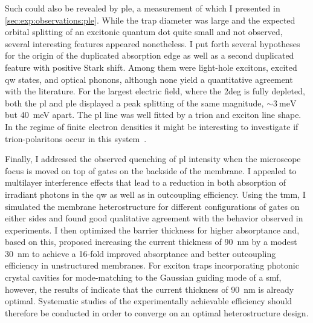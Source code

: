 Such could also be revealed by \acrfull{ple}, a measurement of which I presented in \cref{sec:exp:observations:ple}.
While the trap diameter was large and the expected orbital splitting of an excitonic quantum dot quite small and not observed, several interesting features appeared nonetheless.
I put forth several hypotheses for the origin of the duplicated absorption edge as well as a second duplicated feature with positive Stark shift.
Among them were light-hole excitons, excited \gls{qw} states, and optical phonons, although none yield a quantitative agreement with the literature.
For the largest electric field, where the \gls{2deg} is fully depleted, both the \gls{pl} and \gls{ple} displayed a peak splitting of the same magnitude, $\sim\qty{3}{\milli\electronvolt}$ but \qty{40}{\milli\electronvolt} apart.
The \gls{pl} line was well fitted by a trion and exciton line shape.
In the regime of finite electron densities it might be interesting to investigate if trion-polaritons occur in this system~\cite{Baeten2015,Glazov2020,Huang2023b}.

Finally, I addressed the observed quenching of \gls{pl} intensity when the microscope focus is moved on top of gates on the backside of the membrane.
I appealed to multilayer interference effects that lead to a reduction in both absorption of irradiant photons in the \gls{qw} as well as in outcoupling efficiency.
Using the \acrfull{tmm}, I simulated the membrane heterostructure for different configurations of gates on either sides and found good qualitative agreement with the behavior observed in experiments.
I then optimized the  barrier thickness for higher absorptance and, based on this, proposed increasing the current thickness of \qty{90}{\nano\meter} by a modest \qty{30}{\nano\meter} to achieve a \num{16}-fold improved absorptance and better outcoupling efficiency in unstructured membranes.
For exciton traps incorporating photonic crystal cavities for mode-matching to the Gaussian guiding mode of a \gls{smf}, however, the results of \textcite{Wu2020} indicate that the current thickness of \qty{90}{\nano\meter} is already optimal.
Systematic studies of the experimentally achievable efficiency should therefore be conducted in order to converge on an optimal heterostructure design.

